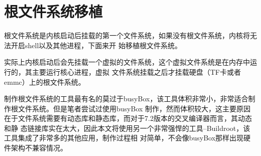 \section{根文件系统移植}
根文件系统是内核启动后挂载的第一个文件系统，如果没有根文件系统，内核将无法开启shell以及其他进程，下面来开
始移植根文件系统。
\begin{note}
	实际上内核启动后会先挂载一个虚拟的文件系统，这个虚拟文件系统是在内存中运行的，其主要运行核心进程，虚拟
	文件系统挂载之后才挂载硬盘（TF卡或者emmc）上的根文件系统。
\end{note}
制作根文件系统的工具最有名的莫过于busyBox，该工具体积非常小，非常适合制作根文件系统。但是笔者尝试过使用busyBox
制作，然而体积较大，这主要原因在于文件系统需要有动态库和静态库，而对于7.2版本的交叉编译器而言，其动态和静
态链接库实在太大，因此本文将使用另一个非常强悍的工具--Buildroot，该工具集成了非常多的其他应用，制作过程相
对简单，不会像busyBox那样出现硬件架构不兼容情况。

